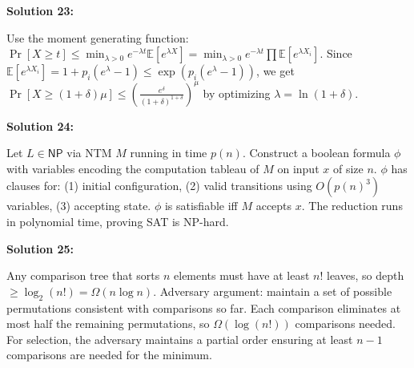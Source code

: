 \documentclass[12pt,a4paper]{exam}
\begin{document}
\vspace{0.5cm}

\textbf{Solution 23:}

Use the moment generating function: $\Pr[X \geq t] \leq \min_{\lambda > 0} e^{-\lambda t} \mathbb{E}[e^{\lambda X}] = \min_{\lambda > 0} e^{-\lambda t} \prod \mathbb{E}[e^{\lambda X_i}]$. Since $\mathbb{E}[e^{\lambda X_i}] = 1 + p_i(e^\lambda - 1) \leq \exp(p_i(e^\lambda - 1))$, we get $\Pr[X \geq (1+\delta)\mu] \leq (\frac{e^\delta}{(1+\delta)^{1+\delta}})^\mu$ by optimizing $\lambda = \ln(1+\delta)$.

\vspace{0.5cm}

\textbf{Solution 24:}

Let $L \in \mathsf{NP}$ via NTM $M$ running in time $p(n)$. Construct a boolean formula $\phi$ with variables encoding the computation tableau of $M$ on input $x$ of size $n$. $\phi$ has clauses for: (1) initial configuration, (2) valid transitions using $O(p(n)^3)$ variables, (3) accepting state. $\phi$ is satisfiable iff $M$ accepts $x$. The reduction runs in polynomial time, proving SAT is NP-hard.

\vspace{0.5cm}

\textbf{Solution 25:}

Any comparison tree that sorts $n$ elements must have at least $n!$ leaves, so depth $\geq \log_2(n!) = \Omega(n \log n)$. Adversary argument: maintain a set of possible permutations consistent with comparisons so far. Each comparison eliminates at most half the remaining permutations, so $\Omega(\log(n!))$ comparisons needed. For selection, the adversary maintains a partial order ensuring at least $n-1$ comparisons are needed for the minimum.

\vspace{0.5cm}
\end{document}
